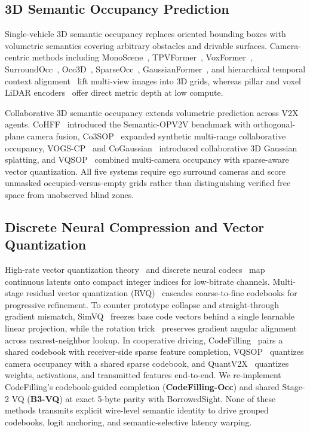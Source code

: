 \documentclass[journal]{IEEEtran}
\begin{document}
\subsection{3D Semantic Occupancy Prediction}

Single-vehicle 3D semantic occupancy replaces oriented bounding boxes with volumetric semantics covering arbitrary obstacles and drivable surfaces. Camera-centric methods including MonoScene~\cite{cao2022monoscene}, TPVFormer~\cite{huang2023tpvformer}, VoxFormer~\cite{li2023voxformer}, SurroundOcc~\cite{wei2023surroundocc}, Occ3D~\cite{tian2023occ3d}, SparseOcc~\cite{liu2024sparseocc}, GaussianFormer~\cite{huang2024gaussianformer}, and hierarchical temporal context alignment~\cite{li2026htcl} lift multi-view images into 3D grids, whereas pillar and voxel LiDAR encoders~\cite{lang2019pointpillars,ronneberger2015unet} offer direct metric depth at low compute.

Collaborative 3D semantic occupancy extends volumetric prediction across V2X agents. CoHFF~\cite{song2024cohff} introduced the Semantic-OPV2V benchmark with orthogonal-plane camera fusion, Co3SOP~\cite{wu2025co3sop} expanded synthetic multi-range collaborative occupancy, VOGS-CP~\cite{chen2026vogscp} and CoGaussian~\cite{verma2026cogaussian} introduced collaborative 3D Gaussian splatting, and VQSOP~\cite{li2026vqsop} combined multi-camera occupancy with sparse-aware vector quantization. All five systems require ego surround cameras and score unmasked occupied-versus-empty grids rather than distinguishing verified free space from unobserved blind zones.

\subsection{Discrete Neural Compression and Vector Quantization}

High-rate vector quantization theory~\cite{gray1998quantization} and discrete neural codecs~\cite{vandenoord2017vqvae} map continuous latents onto compact integer indices for low-bitrate channels. Multi-stage residual vector quantization (RVQ)~\cite{zeghidour2021soundstream,defossez2023encodec} cascades coarse-to-fine codebooks for progressive refinement. To counter prototype collapse and straight-through gradient mismatch, SimVQ~\cite{zhu2025simvq} freezes base code vectors behind a single learnable linear projection, while the rotation trick~\cite{fifty2025rotation} preserves gradient angular alignment across nearest-neighbor lookup. In cooperative driving, CodeFilling~\cite{hu2024codefilling} pairs a shared codebook with receiver-side sparse feature completion, VQSOP~\cite{li2026vqsop} quantizes camera occupancy with a shared sparse codebook, and QuantV2X~\cite{zhao2026quantv2x} quantizes weights, activations, and transmitted features end-to-end. We re-implement CodeFilling's codebook-guided completion (\textbf{CodeFilling-Occ}) and shared Stage-2 VQ (\textbf{B3-VQ}) at exact 5-byte parity with BorrowedSight. None of these methods transmits explicit wire-level semantic identity to drive grouped codebooks, logit anchoring, and semantic-selective latency warping.
\end{document}
